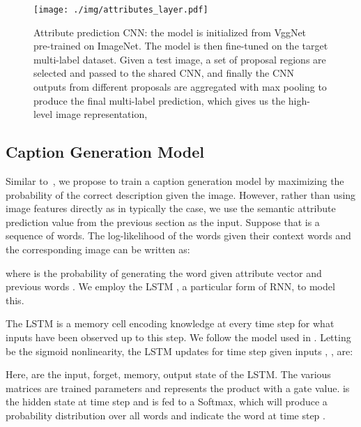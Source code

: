 \documentclass[10pt,journal,compsoc]{IEEEtran}
\begin{document}
\begin{figure}[t!]
  \centering
  \texttt{[image: ./img/attributes\_layer.pdf]}\\
  \caption{Attribute prediction CNN: the model is initialized from VggNet~\cite{simonyan2014very} pre-trained on ImageNet. The model is then fine-tuned on the target multi-label dataset. Given a test image, a set of proposal regions are selected and passed to the shared CNN, and finally the CNN outputs from different proposals are aggregated with max pooling to produce the final multi-label prediction, which gives us the high-level image representation, }
  \label{img:attributes}
  \vspace{-10pt}
\end{figure}

\subsection{Caption Generation Model}
\label{subsec:caption_model}
Similar to~\cite{Karpathy2014deepvs,mao2014deep,vinyals2014show}, we propose to train a caption generation model by maximizing the probability of the correct description given the image. However, rather than using image features directly as in typically the case, we use the semantic attribute prediction value  from the previous section as the input. Suppose that  is a sequence of words. The log-likelihood of the words given their context words and the corresponding image can be written as:

where  is the probability of generating the word  given attribute vector  and previous words . We employ the LSTM \cite{hochreiter1997long}, a particular form of RNN, to model this.

The LSTM is a memory cell encoding knowledge at every time step for what inputs have been observed up to this step. We follow the model used in \cite{zaremba2014learning}. Letting  be the sigmoid nonlinearity, the LSTM updates for time step  given inputs , ,  are:

\vspace{-10pt}


Here,  are the input, forget, memory, output state of the LSTM. The various  matrices are trained parameters and  represents the product with a gate value.  is the hidden state at time step  and is fed to a Softmax, which will produce a probability distribution  over all words and indicate the word at time step .
\end{document}

